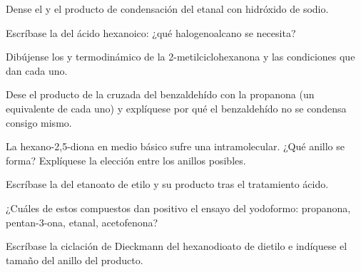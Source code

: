 \begin{exercise}[$\star$]\label{exo:b2:enolates-aldol:3}
Dense el  y el producto de condensación del etanal con hidróxido de sodio.
\end{exercise}

\begin{exercise}[$\star$]\label{exo:b2:enolates-aldol:4}
Escríbase la  del ácido hexanoico: ¿qué halogenoalcano se necesita?
\end{exercise}

\begin{exercise}[$\star\star$]\label{exo:b2:enolates-aldol:5}
Dibújense los  y termodinámico de la 2-metilciclohexanona y las condiciones que dan
cada uno.
\end{exercise}

\begin{exercise}[$\star\star$]\label{exo:b2:enolates-aldol:6}
Dese el producto de la  cruzada del benzaldehído con la propanona (un equivalente
de cada uno) y explíquese por qué el benzaldehído no se condensa consigo mismo.
\end{exercise}

\begin{exercise}[$\star\star$]\label{exo:b2:enolates-aldol:7}
La hexano-2,5-diona en medio básico sufre una  intramolecular. ¿Qué anillo se forma? Explíquese la
elección entre los anillos posibles.
\end{exercise}

\begin{exercise}[$\star\star$]\label{exo:b2:enolates-aldol:8}
Escríbase la  del etanoato de etilo y su producto tras el tratamiento ácido.
\end{exercise}

\begin{exercise}[$\star\star$]\label{exo:b2:enolates-aldol:9}
¿Cuáles de estos compuestos dan positivo el ensayo del yodoformo: propanona, pentan-3-ona, etanal, acetofenona?
\end{exercise}

\begin{exercise}[$\star\star\star$]\label{exo:b2:enolates-aldol:10}
Escríbase la ciclación de Dieckmann del hexanodioato de dietilo e indíquese el tamaño del anillo del producto.
\end{exercise}

